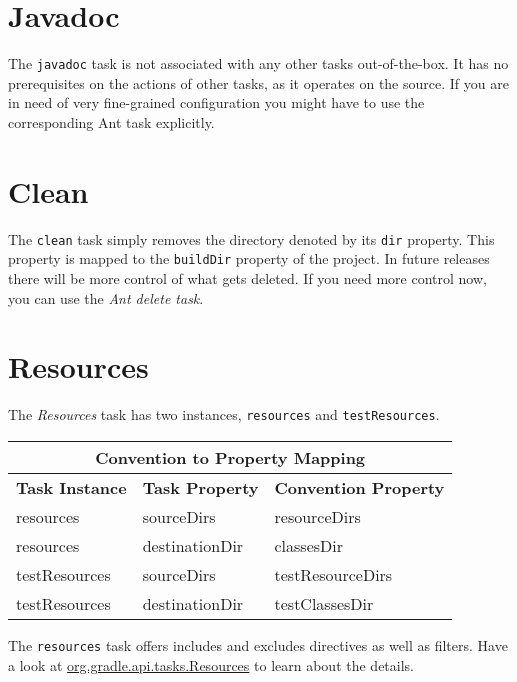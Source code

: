 \section{Javadoc} %
\label{sec:javadoc}
The \texttt{javadoc} task is not associated with any other tasks out-of-the-box. It has no prerequisites on the actions of other tasks, as it operates on the source. If you are in need of very fine-grained configuration you might have to use the corresponding Ant task explicitly. 

\section{Clean} %
\label{sec:clean}
The \texttt{clean} task simply removes the directory denoted by its \texttt{dir} property. This property is mapped to the \texttt{buildDir} property of the project. In future releases there will be more control of what gets deleted. If you need more control now, you can use the \emph{Ant delete task}.  

\section{Resources} %
\label{sec:resources}
The \emph{Resources} task has two instances, \texttt{resources} and \texttt{testResources}. 
\begin{center}
	\begin{tabular}{|l|l|l|} \hline
		\multicolumn{3}{|c|}{Convention to Property Mapping} \\ \hline
		\textbf{Task Instance} & \textbf{Task Property} & \textbf{Convention Property} \\ \hline
		resources & sourceDirs & resourceDirs \\ \hline
		resources & destinationDir & classesDir \\ \hline
		testResources & sourceDirs & testResourceDirs \\ \hline
		testResources & destinationDir & testClassesDir \\ \hline
	\end{tabular} 
\end{center}
\noindent The \texttt{resources} task offers includes and excludes directives as well as filters. Have a look at \href{}{org.gradle.api.tasks.Resources} to learn about the details.


